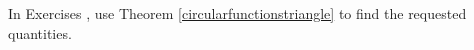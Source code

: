 {\noindent In Exercises}
{, use Theorem \ref{circularfunctionstriangle} to find the requested quantities.}
